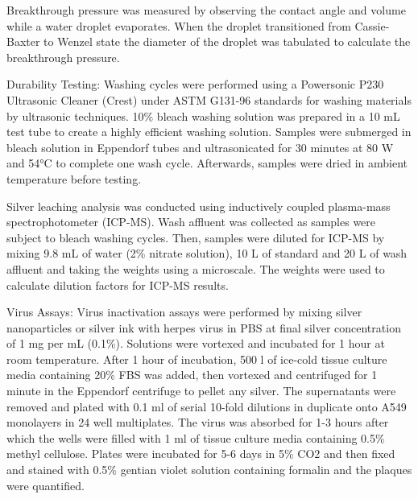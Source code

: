 \documentclass[10pt,letterpaper]{article}
\begin{document}
Breakthrough pressure was measured by observing the contact angle and volume while a water droplet evaporates. When the droplet transitioned from Cassie-Baxter to Wenzel state the diameter of the droplet was tabulated to calculate the breakthrough pressure.





Durability Testing: Washing cycles were performed using a Powersonic P230 Ultrasonic Cleaner (Crest) under ASTM G131-96 standards for washing materials by ultrasonic techniques. 10\% bleach washing solution was prepared in a 10 mL test tube to create a highly efficient washing solution. Samples were submerged in bleach solution in Eppendorf tubes and ultrasonicated for 30 minutes at 80 W and 54°C to complete one wash cycle. Afterwards, samples were dried in ambient temperature before testing.

Silver leaching analysis was conducted using inductively coupled plasma-mass spectrophotometer (ICP-MS). Wash affluent was collected as samples were subject to bleach washing cycles. Then, samples were diluted for ICP-MS by mixing 9.8 mL of water (2\% nitrate solution), 10 \micro L of standard and 20 \micro L of wash affluent and taking the weights using a microscale. The weights were used to calculate dilution factors for ICP-MS results. 


Virus Assays: Virus inactivation assays were performed by mixing silver nanoparticles or silver ink with  herpes virus in PBS at final silver concentration of 1 mg per mL (0.1\%). Solutions were vortexed and incubated for 1 hour %
at room temperature. After 1 hour of incubation, 500 \micro l of ice-cold tissue culture media containing 20\% FBS was added, then vortexed and centrifuged for 1 minute in the Eppendorf centrifuge to pellet any silver. The supernatants were removed and plated with 0.1 ml of serial 10-fold dilutions in duplicate onto A549 monolayers in 24 well multiplates. The virus was absorbed for 1-3 hours after which the wells were filled with 1 ml of tissue culture media containing 0.5\% methyl cellulose.  Plates were incubated for 5-6 days in 5\% CO2 and then fixed and stained with 0.5\% gentian violet solution containing formalin and the plaques were quantified.
\end{document}
